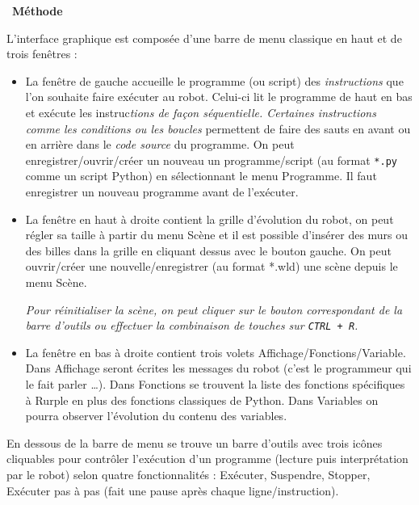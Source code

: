 \documentclass[a4paper, french, 12pt]{article}  %
\newcounter{prog}
\newenvironment{methode}[1]
{\par \medskip    \noindent  
 \begin {bclogo}[arrondi =0.1,logo=\bcoutil, marge=4,noborder = true] {~\textbf{Méthode}   {\itshape #1} }  \par}
{
\end{bclogo}
 \par \bigskip }
\begin{document}
\begin{methode}{}
L'interface graphique est composée d'une barre de menu classique en haut et de trois fen\^etres :
\begin{itemize}
  \item La fen\^etre de gauche  accueille le programme (ou script)  des \textit{instructions} que l'on souhaite faire exécuter au robot. Celui-ci lit le programme de haut en bas et exécute les instruc\textit{tions de façon \textit{séquentielle}. Certaines instructions comme les \textit{condition}s ou les boucles} permettent de faire des sauts en avant ou en arrière dans le \textit{code source} du programme. On peut enregistrer/ouvrir/créer un nouveau  un programme/script (au format \texttt{*.py} comme un script Python) en sélectionnant le menu Programme. Il faut enregistrer un nouveau programme avant de l'exécuter.
  
  \item La fen\^etre en haut à droite contient la grille d'évolution du robot, on peut régler sa taille à partir du menu Scène et il est possible d'insérer des murs ou des billes dans la grille en cliquant dessus avec le bouton gauche. On peut ouvrir/créer une nouvelle/enregistrer (au format *.wld) une scène depuis le menu Scène.
  
{\itshape
\bcattention{}
 Pour réinitialiser la scène, on peut cliquer sur le bouton correspondant de la barre d'outils ou effectuer la combinaison de touches sur \texttt{CTRL + R}.
 }
  
  \item La fen\^etre en bas à droite contient trois volets Affichage/Fonctions/Variable.  Dans Affichage seront écrites  les messages du robot (c'est le programmeur qui le fait parler \ldots ). Dans Fonctions se trouvent la liste des fonctions spécifiques à Rurple en plus des fonctions classiques de Python. Dans Variables on pourra observer l'évolution du contenu des variables.

\end{itemize}

En dessous de la barre de menu se trouve un barre d'outils avec trois ic\^ones cliquables pour contr\^oler l'exécution d'un programme (lecture puis interprétation par le robot) selon quatre fonctionnalités : Exécuter, Suspendre, Stopper, Exécuter pas à pas (fait une pause après chaque ligne/instruction).


\end{methode}
\end{document}
